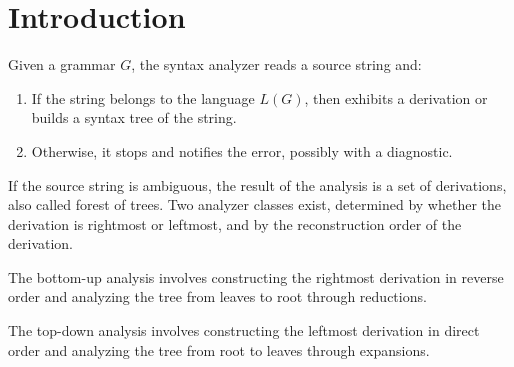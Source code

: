 \section{Introduction}

Given a grammar $G$, the syntax analyzer reads a source string and: 
\begin{enumerate}
    \item If the string belongs to the language $L(G)$, then exhibits a derivation or builds a syntax tree of the string. 
    \item Otherwise, it stops and notifies the error, possibly with a diagnostic.
\end{enumerate}
If the source string is ambiguous, the result of the analysis is a set of derivations, also called forest of trees. 
Two analyzer classes exist, determined by whether the derivation is rightmost or leftmost, and by the reconstruction order of the derivation.
\begin{definition}
    The bottom-up analysis involves constructing the rightmost derivation in reverse order and analyzing the tree from leaves to root through reductions.
\end{definition}
\begin{definition}
    The top-down analysis involves constructing the leftmost derivation in direct order and analyzing the tree from root to leaves through expansions.
\end{definition}
